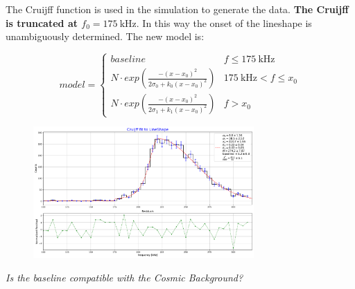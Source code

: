 \documentclass[8pt]{beamer}
\begin{document}
\begin{frame}

The Cruijff function is used in the simulation to generate the data. \textbf{The Cruijff is truncated at $f_{0} = \SI{175}{\kilo \hertz}$}. In this way the onset of the lineshape is unambiguously determined. The new model is:

\begin{equation}
model =
\begin{cases}
baseline 	& f \leqslant \SI{175}{\kilo \hertz} \\
N \cdot exp(  \frac{-(x - x_{0})^2}{2\sigma_{0} + k_{0}(x - x_{0})^{2}}) & \SI{175}{\kilo \hertz} < f \leqslant x_{0} \\
N \cdot exp(  \frac{-(x - x_{0})^2}{2\sigma_{1} + k_{1}(x - x_{0})^{2}}) &  f >  x_{0}
\end{cases}
\end{equation}

\begin{figure}[hbtp]
\centering
\includegraphics[width = 0.75\textwidth]{../LineShape/Plot/TruncatedLineShape.pdf}
\end{figure}

\textit{Is the baseline compatible with the Cosmic Background?}
\end{frame}
\end{document}
